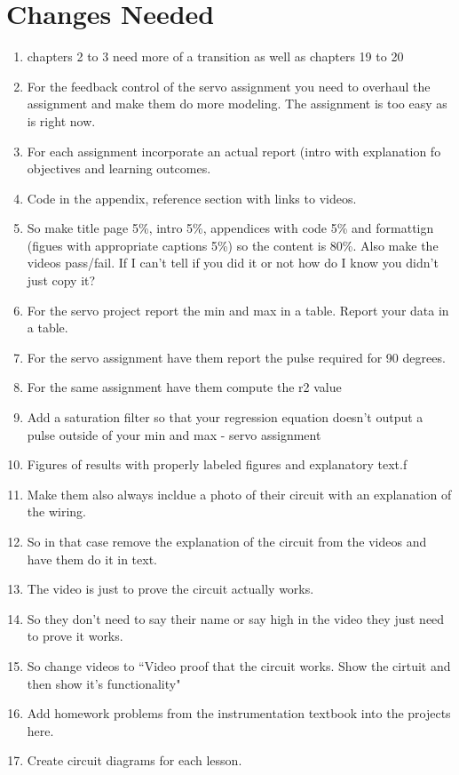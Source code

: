 \section{Changes Needed}
\begin{enumerate}[itemsep=-5pt]
\item chapters 2 to 3 need more of a transition as well as chapters 19 to 20
\item For the feedback control of the servo assignment you need to overhaul the assignment and make them do more modeling. The assignment is too easy as is right now. 
\item For each assignment incorporate an actual report (intro with explanation fo objectives and learning outcomes.
\item Code in the appendix, reference section with links to videos.
\item So make title page 5\%, intro 5\%, appendices with code 5\% and formattign (figues with appropriate captions 5\%) so the content is 80\%. Also make the videos pass/fail. If I can't tell if you did it or not how do I know you didn't just copy it?
\item For the servo project report the min and max in a table. Report your data in a table.
\item For the servo assignment have them report the pulse required for 90 degrees.
\item For the same assignment have them compute the r2 value
\item Add a saturation filter so that your regression equation doesn't output a pulse outside of your min and max - servo assignment
\item Figures of results with properly labeled figures and explanatory text.f
\item Make them also always incldue a photo of their circuit with an explanation of the wiring.
\item So in that case remove the explanation of the circuit from the videos and have them do it in text.
\item The video is just to prove the circuit actually works.
\item So they don't need to say their name or say high in the video they just need to prove it works.
\item So change videos to ``Video proof that the circuit works. Show the cirtuit and then show it's functionality"
\item Add homework problems from the instrumentation textbook into the projects here. 
\item Create circuit diagrams for each lesson.

\end{enumerate}
